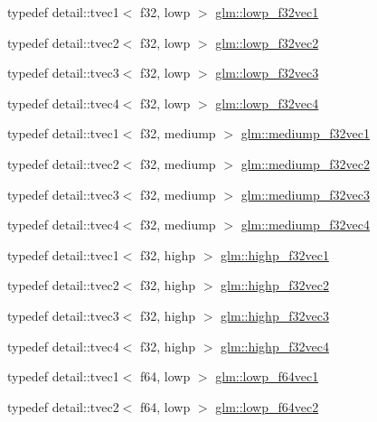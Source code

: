 \begin{DoxyCompactItemize}
\item 
typedef detail\+::tvec1$<$ f32, lowp $>$ \hyperlink{group__gtc__type__precision_gae802918ade0497b72c606430830f5ebb}{glm\+::lowp\+\_\+f32vec1}
\item 
typedef detail\+::tvec2$<$ f32, lowp $>$ \hyperlink{group__gtc__type__precision_ga7faa2c9884c87b1e6512a966adad69e4}{glm\+::lowp\+\_\+f32vec2}
\item 
typedef detail\+::tvec3$<$ f32, lowp $>$ \hyperlink{group__gtc__type__precision_ga1f878d91a5f5ab92c756244b62af7248}{glm\+::lowp\+\_\+f32vec3}
\item 
typedef detail\+::tvec4$<$ f32, lowp $>$ \hyperlink{group__gtc__type__precision_ga59f7292d7ed0b7df72e6aa31010e2648}{glm\+::lowp\+\_\+f32vec4}
\item 
typedef detail\+::tvec1$<$ f32, mediump $>$ \hyperlink{group__gtc__type__precision_gaf3d4077b241fbcab529fb0e0d88c0df6}{glm\+::mediump\+\_\+f32vec1}
\item 
typedef detail\+::tvec2$<$ f32, mediump $>$ \hyperlink{group__gtc__type__precision_gaf53d380f948fdbb540eab960f2ad4b58}{glm\+::mediump\+\_\+f32vec2}
\item 
typedef detail\+::tvec3$<$ f32, mediump $>$ \hyperlink{group__gtc__type__precision_gada8879dd10f28428e2eb1ae62f643f65}{glm\+::mediump\+\_\+f32vec3}
\item 
typedef detail\+::tvec4$<$ f32, mediump $>$ \hyperlink{group__gtc__type__precision_gaa5a1b058d185d87504591a11c6247518}{glm\+::mediump\+\_\+f32vec4}
\item 
typedef detail\+::tvec1$<$ f32, highp $>$ \hyperlink{group__gtc__type__precision_gac8be8ce31b9df0a5005d7c7458a3d03e}{glm\+::highp\+\_\+f32vec1}
\item 
typedef detail\+::tvec2$<$ f32, highp $>$ \hyperlink{group__gtc__type__precision_gabba3e1b3ae0bcaa7aaac573c08c2f8d3}{glm\+::highp\+\_\+f32vec2}
\item 
typedef detail\+::tvec3$<$ f32, highp $>$ \hyperlink{group__gtc__type__precision_ga581a4a4eb1f3a269d16af0c4e2d8daf4}{glm\+::highp\+\_\+f32vec3}
\item 
typedef detail\+::tvec4$<$ f32, highp $>$ \hyperlink{group__gtc__type__precision_ga53d3c1a17e2e6f26ee5ad1e8879d710e}{glm\+::highp\+\_\+f32vec4}
\item 
typedef detail\+::tvec1$<$ f64, lowp $>$ \hyperlink{group__gtc__type__precision_ga47d9eed23b6e3fc58676176be392293a}{glm\+::lowp\+\_\+f64vec1}
\item 
typedef detail\+::tvec2$<$ f64, lowp $>$ \hyperlink{group__gtc__type__precision_gaf2c6cba98bb2c2f1560d8edff4b70938}{glm\+::lowp\+\_\+f64vec2}

\end{DoxyCompactItemize}
